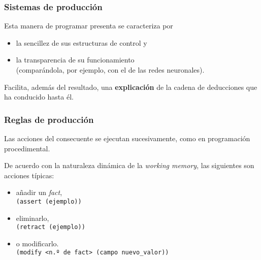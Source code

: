 \documentclass{beamer}    %
\newcommand\cod{../scripts}
\begin{document}

\begin{frame}
 \frametitle{Sistemas de producción}

 Esta manera de programar presenta se caracteriza por

 \begin{itemize}
 \item
 la sencillez de sus estructuras de control y

 \item
 la transparencia de su funcionamiento\\[2mm]

 (comparándola, por ejemplo, con el de las redes neuronales).
 \end{itemize}
 \vspace{5mm}

 Facilita, además del resultado, una {\bf explicación} de la
 cadena de deducciones que ha conducido hasta él.
\end{frame}


\begin{frame}
 \frametitle{Reglas de producción}

 Las acciones del consecuente se ejecutan sucesivamente,
 como en programación procedimental.
 \vspace{5mm}

 De acuerdo con la naturaleza dinámica de la \emph{working
   memory}, las siguientes son acciones típicas:

 \begin{itemize}
 \item añadir un \emph{fact},\\
 \hspace{1.5cm}\texttt{(assert (ejemplo))}
 \item eliminarlo,\\
 \hspace{1.5cm}\texttt{(retract (ejemplo))}
 \item o modificarlo.\\
 \hspace{1.5cm}\texttt{(modify <n.º de fact> (campo nuevo\_valor))}
 \end{itemize}
\end{frame}

\end{document}
